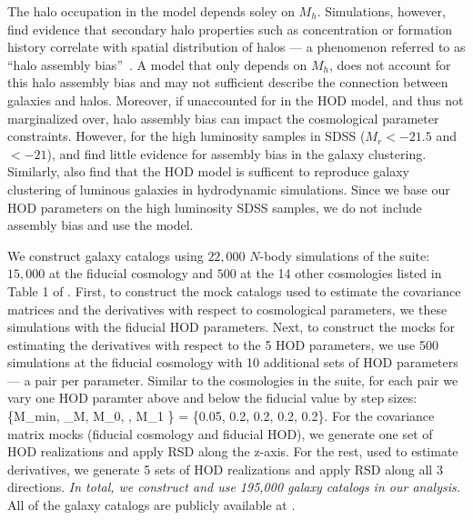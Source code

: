 The halo occupation in the \cite{zheng2007} model depends soley on $M_h$. 
Simulations, however, find evidence that secondary halo properties such as
concentration or formation history correlate with spatial distribution of
halos --- a phenomenon referred to as ``halo assembly bias''~\citep[\eg][]{sheth2004,
gao2005, harker2006, wechsler2006, dalal2008, wang2009a, lacerna2014,
contreras2020, hadzhiyska2020}.
A model that only depends on $M_h$, does not account for this halo assembly 
bias and may not sufficient describe the connection between galaxies and 
halos. Moreover, if unaccounted for in the HOD model, and thus not marginalized 
over, halo assembly bias can impact the cosmological parameter constraints. 
However, for the high luminosity samples in SDSS ($M_r < -21.5$  and $<-21$), 
\cite{zentner2016} and \cite{vakili2019} find little evidence for assembly bias 
in the galaxy clustering. Similarly, \cite{beltz-mohrmann2020} also find that
the \cite{zheng2007} HOD model is sufficent to reproduce galaxy clustering of
luminous galaxies in hydrodynamic simulations. Since we base our HOD parameters
on the high luminosity SDSS samples, we do not include assembly bias and use
the \cite{zheng2007} model. 

We construct galaxy catalogs using $22,000$ $N$-body simulations of the \quij
suite: $15,000$ at the fiducial cosmology and $500$ at the 14 other cosmologies
listed in Table 1 of \cite{hahn2020}. First, to construct the mock catalogs
used to estimate the covariance matrices and the derivatives with respect to
cosmological parameters, we these simulations with the fiducial HOD parameters.
Next, to construct the mocks for estimating the derivatives with respect to the
5 HOD parameters, we use 500 \quij simulations at the fiducial cosmology with
10 additional sets of HOD parameters --- a pair per parameter. Similar to the
cosmologies in the \quij suite, for each pair we vary one HOD paramter above
and below the fiducial value by step sizes:
\beq
\{\Delta M_{\rm min}, \Delta \sigma_{\log M}, \Delta \log M_0, \Delta \alpha,
\Delta \log M_1 \} = \{0.05, 0.2, 0.2, 0.2, 0.2\}.
\eeq
For the covariance matrix mocks (fiducial cosmology and fiducial HOD), we
generate one set of HOD realizations and apply RSD along the z-axis. For the
rest, used to estimate derivatives, we generate 5 sets of HOD realizations and 
apply RSD along all 3 directions. {\em In total, we construct and use 195,000
galaxy catalogs in our analysis.} All of the galaxy catalogs are publicly available
at .
